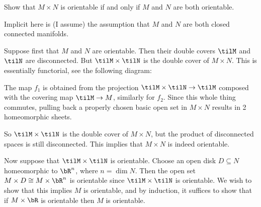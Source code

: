 \begin{homework}[e]
   Show that $M\times N$ is orientable if and only if $M$ and $N$ are both orientable.
  \begin{prf}
    Implicit here is (I assume) the assumption that $M$ and $N$ are both closed connected manifolds.

    Suppose first that $M$ and $N$ are orientable. Then their double covers $\tilM$ and $\tilN$ are disconnected. But $\tilM\times \tilN$ is the double cover of $M\times N$. This is essentially functorial, see the following diagram:
    \begin{center}
    \end{center}
    The map $f_1$ is obtained from the projection $\tilM\times \tilN \to \tilM$ composed with the covering map $\tilM\to M$, similarly for $f_2$. Since this whole thing commutes, pulling back a properly chosen basic open set in $M\times N$ results in 2 homeomorphic sheets.

    So $\tilM\times \tilN$ is the double cover of $M\times N$, but the product of disconnected spaces is still disconnected. This implies that $M\times N$ is indeed orientable.

    \bigskip

    Now suppose that $\tilM \times \tilN$ is orientable. Choose an open disk $D\subseteq N$ homeomorphic to $\bR^n$, where $n = \dim N$. Then the open set $M\times D \cong M\times \bR^n$ is orientable since $\tilM\times \tilN$ is orientable. We wish to show that this implies $M$ is orientable, and by induction, it suffices to show that if $M\times \bR$ is orientable then $M$ is orientable.


\end{prf}
\end{homework}
